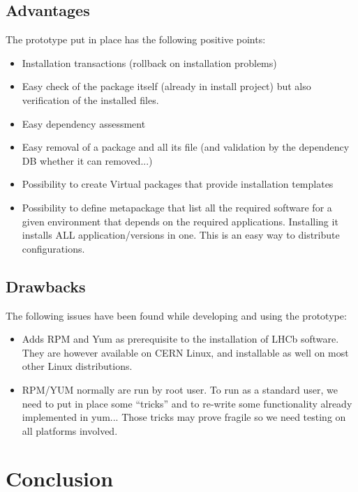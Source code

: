 \documentclass{lhcbnote}
\begin{document}
\subsection{Advantages}

The prototype put in place has the following positive points:

\begin{itemize}
\item Installation transactions (rollback on installation problems)
\item Easy check of the package itself (already in install project) but also verification of the installed files.
\item Easy dependency assessment
\item Easy removal of a package and all its file (and validation by the dependency DB whether it can removed...)
\item Possibility to create Virtual packages that provide installation templates
\item Possibility to define metapackage that list all the required software for a given environment that depends on the required applications. Installing it installs ALL application/versions in one. This is an easy way to distribute configurations.
\end{itemize}

\subsection{Drawbacks}

The following issues have been found while developing and using the prototype:

\begin{itemize}
\item Adds RPM and Yum as prerequisite to the installation of LHCb software. They are however available on CERN Linux, and installable as well on most other Linux distributions.
\item RPM/YUM normally are run by root user. To run as a standard user, we need to put in place some ``tricks'' and to re-write some functionality already implemented in yum... Those tricks may prove fragile so we need testing on all platforms involved.
\end{itemize}

\section{Conclusion}
\end{document}
